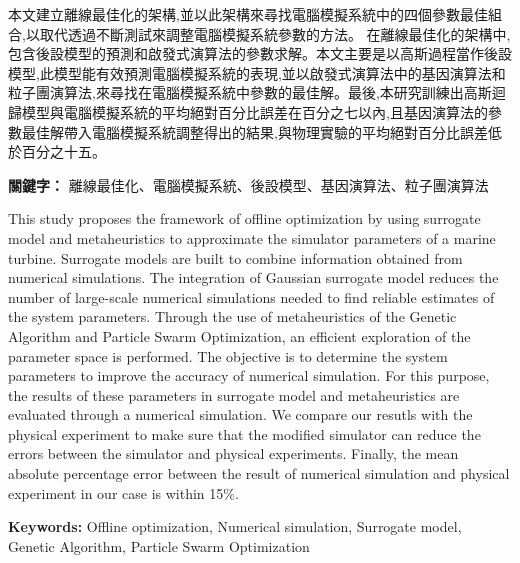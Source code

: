 \begin{abstractzh}

本文建立離線最佳化的架構,並以此架構來尋找電腦模擬系統中的四個參數最佳組合,以取代透過不斷測試來調整電腦模擬系統參數的方法。
在離線最佳化的架構中,包含後設模型的預測和啟發式演算法的參數求解。本文主要是以高斯過程當作後設模型,此模型能有效預測電腦模擬系統的表現,並以啟發式演算法中的基因演算法和粒子團演算法,來尋找在電腦模擬系統中參數的最佳解。最後,本研究訓練出高斯迴歸模型與電腦模擬系統的平均絕對百分比誤差在百分之七以內,且基因演算法的參數最佳解帶入電腦模擬系統調整得出的結果,與物理實驗的平均絕對百分比誤差低於百分之十五。

\bigbreak
\noindent \textbf{關鍵字：}{ 離線最佳化、電腦模擬系統、後設模型、基因演算法、粒子團演算法\makeatletter \makeatother}
\end{abstractzh}

\begin{abstracten}
	
This study proposes the framework of offline optimization by using surrogate model and metaheuristics to approximate the simulator parameters of a marine turbine. Surrogate models are built to combine information obtained from numerical simulations. The integration of Gaussian surrogate model reduces the number of large-scale numerical simulations needed to find reliable estimates of the system parameters. Through the use of metaheuristics of the Genetic Algorithm and Particle Swarm Optimization, an efficient exploration of the parameter space is performed. The objective is to determine the system parameters to improve the accuracy of numerical simulation. For this purpose, the results of these parameters in surrogate model and metaheuristics are evaluated through a numerical simulation. We compare our resutls with the physical experiment to make sure that the modified simulator can reduce the errors between the simulator and physical experiments. Finally, the mean absolute percentage error between the result of numerical simulation and physical experiment in our case is within 15{\%}.

\bigbreak
\noindent \textbf{Keywords:}{ Offline optimization, Numerical simulation, Surrogate model, Genetic Algorithm, Particle Swarm Optimization \makeatletter  \makeatother}
\end{abstracten}

\begin{comment}
\category{I2.10}{Computing Methodologies}{Artificial Intelligence --
Vision and Scene Understanding} \category{H5.3}{Information
Systems}{Information Interfaces and Presentation (HCI) -- Web-based
Interaction.}

\terms{Design, Human factors, Performance.}

\keywords{Region of interest, Visual attention model, Web-based
games, Benchmarks.}
\end{comment}
